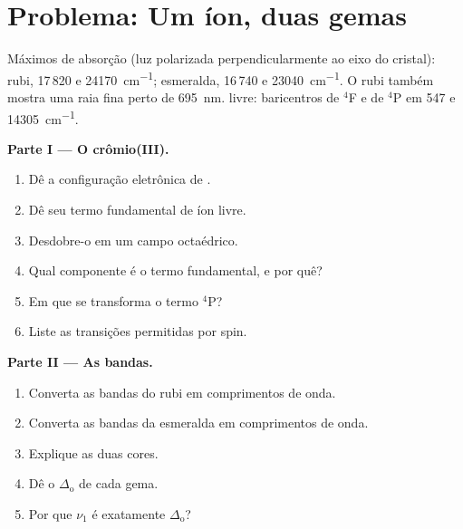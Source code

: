 \section{Problema: Um íon, duas gemas}

\begin{problem}
\label{pb:b3:complex-spectra-magnetism:1}
Máximos de absorção (luz polarizada perpendicularmente ao eixo do cristal): rubi,
17\,820 e \qty{24170}{cm^{-1}}; esmeralda, 16\,740 e \qty{23040}{cm^{-1}}. O rubi também mostra uma raia fina
perto de \qty{695}{nm}.  livre: baricentros de $^4$F e de $^4$P em 547 e \qty{14305}{cm^{-1}}.

\medskip\noindent\textbf{Parte I --- O crômio(III).}
\begin{enumerate}
  \item Dê a configuração eletrônica de .
  \item Dê seu termo fundamental de íon livre.
  \item Desdobre-o em um campo octaédrico.
  \item Qual componente é o termo fundamental, e por quê?
  \item Em que se transforma o termo $^4$P?
  \item Liste as transições permitidas por spin.
\end{enumerate}

\medskip\noindent\textbf{Parte II --- As bandas.}
\begin{enumerate}[resume]
  \item Converta as bandas do rubi em comprimentos de onda.
  \item Converta as bandas da esmeralda em comprimentos de onda.
  \item Explique as duas cores.
  \item Dê o $\Delta_{\mathrm o}$ de cada gema.
  \item Por que $\nu_1$ é exatamente $\Delta_{\mathrm o}$?
\end{enumerate}


\end{problem}
